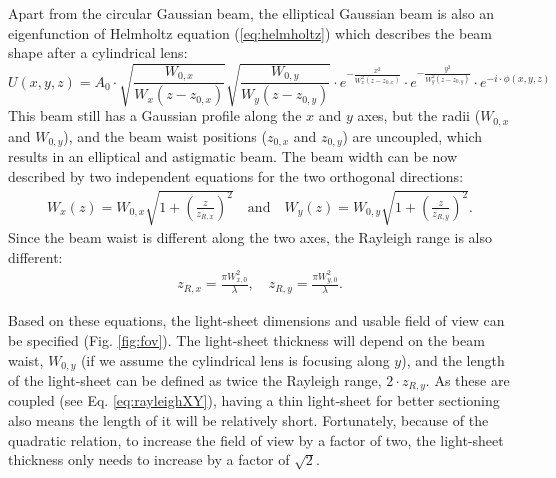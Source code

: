     Apart from the circular Gaussian beam, the elliptical Gaussian beam is also an eigenfunction of Helmholtz equation (\ref{eq:helmholtz}) which describes the beam shape after a cylindrical lens:
    \begin{equation}
      U(x,y,z) = A_0 \cdot \sqrt{\frac{W_{0,x}}{W_x(z-z_{0,x})}} \sqrt{\frac{W_{0,y}}{W_y(z-z_{0,y})}} \cdot e^{-\frac{x^2}{W_x^2(z-z_{0,x})}} \cdot e^{-\frac{y^2}{W_y^2(z-z_{0,y})}} \cdot e^{-i\cdot \phi(x,y,z)}
    \end{equation}
    This beam still has a Gaussian profile along the $x$ and $y$ axes, but the radii ($W_{0,x}$ and $W_{0,y}$), and the beam waist positions ($z_{0,x}$ and $z_{0,y}$) are uncoupled, which results in an elliptical and astigmatic beam. The beam width can be now described by two independent equations for the two orthogonal directions:
    \begin{align}
      W_x(z) = W_{0,x}\sqrt{1+\left( \frac{z}{z_{R,x}} \right)^2}\mathrm{\quad and \quad } W_y(z) = W_{0,y}\sqrt{1+\left( \frac{z}{z_{R,y}} \right)^2}.
    \end{align}
    Since the beam waist is different along the two axes, the Rayleigh range is also different:
    \begin{align}
      z_{R,x} = \frac{\pi W_{x,0}^2}{\lambda}, \quad
      z_{R,y} = \frac{\pi W_{y,0}^2}{\lambda}.
      \label{eq:rayleighXY}
    \end{align}
    
    
    Based on these equations, the light-sheet dimensions and usable field of view can be specified (Fig. \ref{fig:fov}). The light-sheet thickness will depend on the beam waist, $W_{0,y}$ (if we assume the cylindrical lens is focusing along $y$), and the length of the light-sheet can be defined as twice the Rayleigh range, $2 \cdot z_{R,y}$. As these are coupled (see Eq. \ref{eq:rayleighXY}), having a thin light-sheet for better sectioning also means the length of it will be relatively short. Fortunately, because of the quadratic relation, to increase the field of view by a factor of two, the light-sheet thickness only needs to increase by a factor of $\sqrt{2}$.


